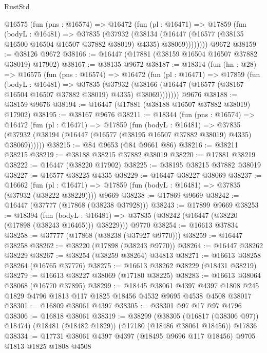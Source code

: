 \begin{lexlean}{RustStd}
\begin{coremodule}
      @16575
        (fun (pns : @16574) =>
        @16472
          (fun (pl : @16471) =>
          @17859
            (fun (bodyL : @16481) =>
            @37835
              (@37932
                (@38134
                  (@16447 (@16577 (@38135 @16500 @16504 @16507 @37882 @38019) @4335) @38069))))))))
    @9672
@38159 := @38126 @9672
@38166 := @16447 (@17881 (@38159 @16504 @16507 @37882 @38019) @17902)
@38167 := @38135 @9672
@38187 := @18314
    (fun (hn : @28) =>
    @16575
      (fun (pns : @16574) =>
      @16472
        (fun (pl : @16471) =>
        @17859
          (fun (bodyL : @16481) =>
          @37835
            (@37932
              (@38166 (@16447 (@16577 (@38167 @16504 @16507 @37882 @38019) @4335) @38069)))))))
    @9676
@38188 := @38159 @9676
@38194 := @16447 (@17881 (@38188 @16507 @37882 @38019) @17902)
@38195 := @38167 @9676
@38211 := @18344
    (fun (pns : @16574) =>
    @16472
      (fun (pl : @16471) =>
      @17859
        (fun (bodyL : @16481) =>
        @37835 (@37932 (@38194 (@16447 (@16577 (@38195 @16507 @37882 @38019) @4335) @38069))))))
@38215 := @84 @9653 (@84 @9661 @86)
@38216 := @38211 @38215
@38219 := @38188 @38215 @37882 @38019
@38220 := @17881 @38219
@38222 := @16447 (@38220 @17902)
@38225 := @38195 @38215 @37882 @38019
@38227 := @16577 @38225 @4335
@38229 := @16447 @38227 @38069
@38237 := @16662
    (fun (pl : @16471) => @17859 (fun (bodyL : @16481) => @37835 (@37932 (@38222 @38229))))
    @9669
@38238 := @17869 @9669
@38242 := @16447 (@37777 (@17868 (@38238 @37928)))
@38243 := @17899 @9669
@38253 := @18394
    (fun (bodyL : @16481) => @37835 (@38242 (@16447 (@38220 (@17898 (@38243 @16465))) @38229)))
    @9770
@38254 := @16613 @37834
@38258 := @37777 (@17868 (@38238 (@37927 @9770)))
@38259 := @16447 @38258
@38262 := @38220 (@17898 (@38243 @9770))
@38264 := @16447 @38262 @38229
@38267 := @38254 (@38259 @38264) @34813
@38271 := @16613 @38258 @38264 (@16765 @37776)
@38275 := @16613 @38262 @38229 (@18431 @38219)
@38279 := @16613 @38227 @38069 (@17180 @38225)
@38283 := @16613 @38064 @38068 (@16770 @37895)
@38299 := @18445
    @38061
    @4397
    @4397
    @1808
    @245
    @1829
    @4796
    @1813
    @117
    @1825
    @18456
    @4532
    @9695
    @4538
    @4508
    @38017
@38301 := @16809 @38061 @4397
@38305 := @38301 @97 @17 @97 @4796
@38306 := @16818 @38061
@38319 := @38299
    (@38305 (@16817 (@38306 @97)) @18474)
    (@18481 (@18482 @1829))
    (@17180 (@18486 @38061 @18456))
    @17836
@38334 := @17731
    @38061
    @4397
    @4397
    (@18495 @9696 @117 @18456)
    @9705
    @1813
    @1825
    @1808
    @4508

\end{coremodule}
\end{lexlean}
